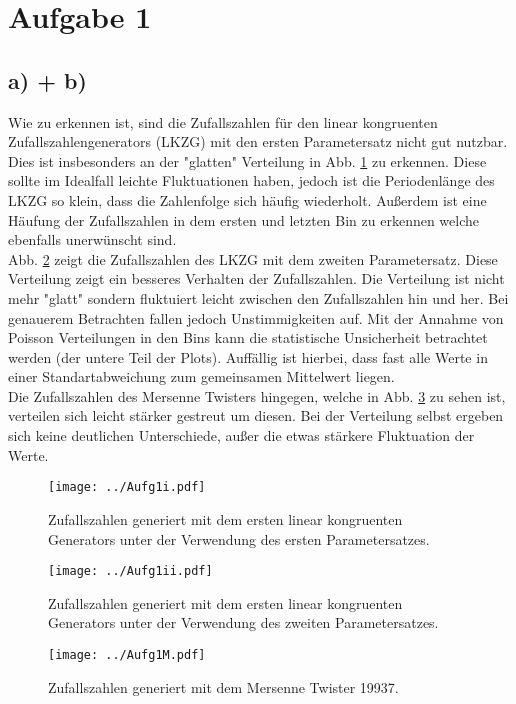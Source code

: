 \section*{Aufgabe 1}
\label{sec:Aufgabe1}
\subsection*{a) + b)}

Wie zu erkennen ist, sind die Zufallszahlen für den linear kongruenten Zufallszahlengenerators (LKZG) mit den ersten Parametersatz nicht gut nutzbar.
Dies ist insbesonders an der "glatten" Verteilung in Abb. \ref{i} zu erkennen. 
Diese sollte im Idealfall leichte Fluktuationen haben, jedoch ist die Periodenlänge des LKZG so klein, dass die Zahlenfolge sich häufig wiederholt.
Außerdem ist eine Häufung der Zufallszahlen in dem ersten und letzten Bin zu erkennen welche ebenfalls unerwünscht sind.\\
Abb. \ref{ii} zeigt die Zufallszahlen des LKZG mit dem zweiten Parametersatz. 
Diese Verteilung zeigt ein besseres Verhalten der Zufallszahlen.
Die Verteilung ist nicht mehr "glatt" sondern fluktuiert leicht zwischen den Zufallszahlen hin und her.
Bei genauerem Betrachten fallen jedoch Unstimmigkeiten auf.
Mit der Annahme von Poisson Verteilungen in den Bins kann die statistische Unsicherheit betrachtet werden (der untere Teil der Plots).
Auffällig ist hierbei, dass fast alle Werte in einer Standartabweichung zum gemeinsamen Mittelwert liegen.\\
Die Zufallszahlen des Mersenne Twisters hingegen, welche in Abb. \ref{M} zu sehen ist, verteilen sich leicht stärker gestreut um diesen.
Bei der Verteilung selbst ergeben sich keine deutlichen Unterschiede, außer die etwas stärkere Fluktuation der Werte.


\begin{figure}
	\centering
	\texttt{[image: ../Aufg1i.pdf]}
	\caption{Zufallszahlen generiert mit dem ersten linear kongruenten Generators unter der Verwendung des ersten Parametersatzes.}
	\label{i}
\end{figure}

\begin{figure}
	\centering
	\texttt{[image: ../Aufg1ii.pdf]}
	\caption{Zufallszahlen generiert mit dem ersten linear kongruenten Generators unter der Verwendung des zweiten Parametersatzes.}
	\label{ii}
\end{figure}

\begin{figure}
	\centering
	\texttt{[image: ../Aufg1M.pdf]}
	\caption{Zufallszahlen generiert mit dem Mersenne Twister 19937.}
	\label{M}
\end{figure}
\FloatBarrier
